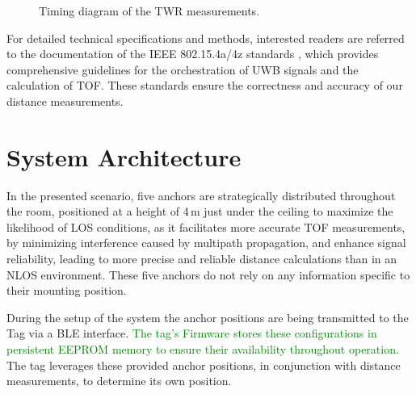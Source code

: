 \documentclass[conference, a4paper]{IEEEtran}
\begin{document}
\begin{figure}
	\centering
	\caption{Timing diagram of the \ac{TWR} measurements.}
	\label{fig:csvbarchart}
\end{figure}

For detailed technical specifications and methods, interested readers are referred to the documentation of the IEEE 802.15.4a/4z standards \cite{IEEE802154a} \cite{IEEE802154z}, which provides comprehensive guidelines for the orchestration of \ac{UWB} signals and the calculation of \ac{TOF}.
These standards ensure the correctness and accuracy of our distance measurements.

\section{System Architecture}\label{section:system_arch}
In the presented scenario, five anchors are strategically distributed throughout the room,
positioned at a height of 4\,m just under the ceiling to maximize the likelihood of 
\ac{LOS} conditions, as it facilitates more accurate \ac{TOF} measurements, by minimizing interference caused by multipath propagation, and enhance signal reliability, leading to more precise and reliable distance calculations than in an \ac{NLOS} environment.
These five anchors do not rely on any information specific to their mounting position.

During the setup of the system the anchor positions are being transmitted to the Tag via a \ac{BLE} interface.
\textcolor{green}{The tag's Firmware stores these configurations in persistent \ac{EEPROM} memory to ensure their availability throughout operation.}
The tag leverages these provided anchor positions, in conjunction with distance measurements, to determine its own position. 
\end{document}
